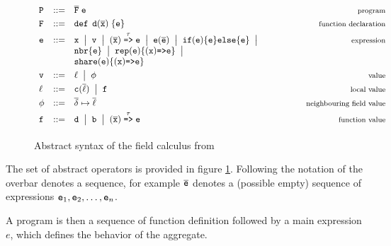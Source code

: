 \begin{figure}[t]
\centering
\centerline{$
        \begin{array}{lcl@{\hspace{18mm}}r}
                \PROGRAM & \BNFcce & \overline{\FUNCTION}  \; \e
                &{ \mbox{\footnotesize program}}
                \\[3pt]
                \FUNCTION & \BNFcce &  \defK \,\; \fname (\overline{\xname}) \; \{ \e \}
                &{ \mbox{\footnotesize function declaration}}
                \\[3pt]
                \e & \BNFcce &  \xname \;\BNFmid\; \anyvalue \;\BNFmid\;  (\overline{\xname}) \toSym{\name} \e \; \BNFmid \; \e(\overline\e) \;\BNFmid\; \fifK (\e) \{\e\} \elseK \{\e\} \;\BNFmid &{ \mbox{\footnotesize expression}} \\
                && \nbrK\{\e\} \;\BNFmid\; \repK(\e)\{ (\xname) \ftoSym \e \} \; \BNFmid \; \\
                && \shareK(\e)\{(\xname) \ftoSym \e \}
                \\[3pt]
                \anyvalue & \BNFcce &  \lvalue \; \BNFmid \; \fvalue
                &{ \mbox{\footnotesize value}}
                \\[3pt]
              \lvalue & \BNFcce &  \dcOf{\dc}{\overline\lvalue} \; \BNFmid \; \funvalue
                &{ \mbox{\footnotesize local value}}
                \\[3pt]
                \fvalue & \BNFcce &  \envmap{\overline\deviceId}{\overline\lvalue}
                &{ \mbox{\footnotesize neighbouring field value}}
                \\[3pt]
                \funvalue & \BNFcce &  \fname \; \BNFmid \; \bname \;\BNFmid\; (\overline{\xname}) \toSym{\name} \e 
                &{ \mbox{\footnotesize function value}}
                \\[3pt]
        \end{array}
        $
}
\caption{Abstract syntax of the field calculus from \cite{FieldCalculus, Share}} \label{fig:fcsyntax}
\end{figure}

The set of abstract operators is provided in figure \ref{fig:fcsyntax}. Following the notation of \cite{FeatherJava} the overbar denotes a sequence, for example $\overline{\mathtt{e}}$  denotes a (possible empty) sequence of expressions $\mathtt{e}_1, \mathtt{e}_2, \dots, \mathtt{e}_n$.

A program is then a sequence of function definition followed by a main expression $e$, which defines the behavior of the aggregate. 

